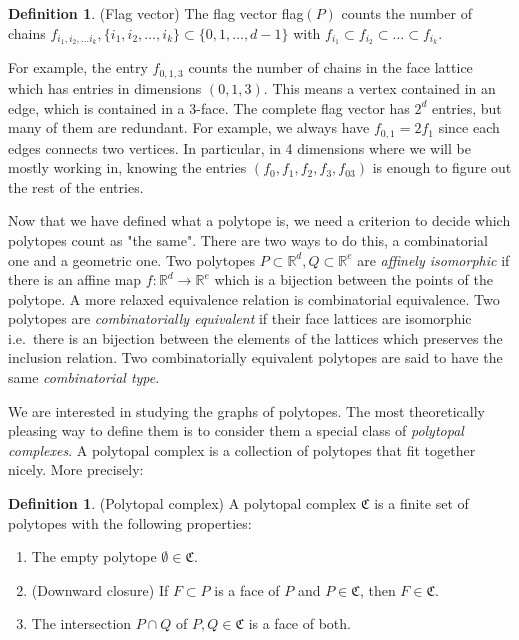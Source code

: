 \documentclass[a4paper,12pt]{book}
\theoremstyle{plain}
\theoremstyle{definition}
\newtheorem{definition}[theorem]{Definition}
\begin{document}
\begin{definition}
 (Flag vector) The flag vector flag$(P)$ counts the number of chains $f_{i_1,i_2,\dots i_k}, \{i_1,i_2,\dots, i_k \} \subset \{0,1,\dots, d-1\}$
with $f_{i_1} \subset f_{i_2} \subset \dots \subset f_{i_k}$.
\end{definition}

For example, the entry $f_{0,1,3}$ counts the number of chains in the face 
lattice which has entries in dimensions $(0,1,3)$. This means a vertex contained in an
edge, which is contained in a 3-face. The complete flag vector has $2^d$ entries,
but many of them are redundant. For example, we always have $f_{0,1} = 2f_1$ since each edges
connects two vertices. In particular, in 4 dimensions where we will be mostly working in,
knowing the entries $(f_0, f_1, f_2, f_3, f_{03})$ is enough to figure out the rest of the entries. 

Now that we have defined what a polytope is, we need a criterion to decide which polytopes 
count as "the same". There are two ways to do this, a combinatorial one and a geometric one.
Two polytopes $P\subset \mathbb{R}^d, Q \subset \mathbb{R}^e$ are 
\textit{affinely isomorphic} if there is an affine map $f: \mathbb{R}^d 
\rightarrow \mathbb{R}^e$ which is a bijection between the points of the 
polytope. A more relaxed equivalence relation is combinatorial equivalence. Two 
polytopes are \textit{combinatorially equivalent} if their face lattices are isomorphic 
i.e.\ there is an bijection between the elements of the lattices which preserves
the inclusion relation. Two combinatorially equivalent polytopes are said to have the 
same \textit{combinatorial type}. 

We are interested in studying the graphs of polytopes. The most theoretically 
pleasing way to define them is to consider them a special class of 
\textit{polytopal complexes}.
A polytopal complex is a collection of polytopes that fit together nicely.
More precisely:
\begin{definition}
 (Polytopal complex) A polytopal complex $\mathfrak{C}$ is a finite set of 
polytopes with the following properties:
\begin{enumerate}
 \item The empty polytope $\emptyset \in \mathfrak{C}$.
  \item (Downward closure) If $F \subset P$ is a face of $P$ and $P \in 
\mathfrak{C}$, then 
$F \in \mathfrak{C}$.
\item The intersection $P\cap Q$ of $P,Q \in \mathfrak{C}$ is a face of both.

\end{enumerate}

\end{definition}
\end{document}
